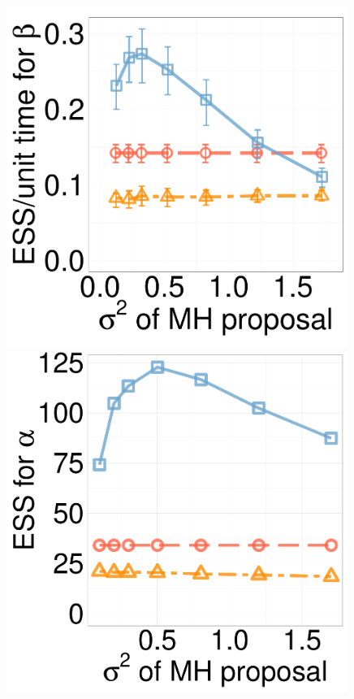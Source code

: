 \begin{figure}[H]
\begin{minipage}[hp]{0.24\linewidth}
	\end{minipage}
  \begin{minipage}[hp]{0.24\linewidth}
  \centering
    \includegraphics [width=0.99\textwidth, angle=0]{figs/new_experiment_figs/cq_beta_dim10_k2.pdf}
	\end{minipage}
  \centering
  \begin{minipage}[!hp]{0.24\linewidth}
  \centering
    \includegraphics [width=0.99\textwidth, angle=0]{figs/ess/QC_D3alpha_k2.pdf}

\end{minipage}
\end{figure}
